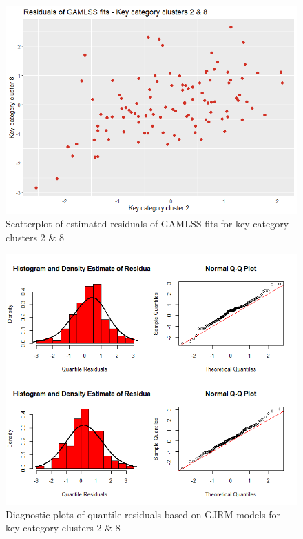
\begin{figure}[H]
\centering
  \includegraphics[width=0.45\linewidth]{figures/scatter_res_kcc_28.png}
  \caption{Scatterplot of estimated residuals of GAMLSS fits for key category clusters 2 \& 8}
  \label{fig:scatter_res_kcc_28}
\end{figure}






\begin{figure}[H]
\centering
  \includegraphics[width=0.95\linewidth]{figures/res_hist_qqplot_28.png}
  \caption{Diagnostic plots of quantile residuals based on \ac{GJRM} models for key category clusters 2 \& 8}
  \label{fig:res_hist_qqplot_28}
\end{figure}


